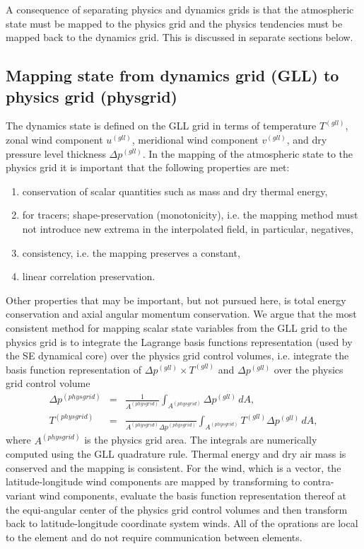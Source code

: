 
A consequence of separating physics and dynamics grids is that the atmospheric state must be mapped to the physics grid and the physics tendencies must be mapped back to the dynamics grid. This is discussed in separate sections below. 
\subsection{Mapping state from dynamics grid (GLL) to physics grid (physgrid)}
The dynamics state is defined on the GLL grid in terms of temperature $T^{(gll)}$, zonal wind component $u^{(gll)}$, meridional wind component $v^{(gll)}$, and dry pressure level thickness $\Delta p^{(gll)}$. In the mapping of the atmospheric state to the physics grid it is important that the following properties are met:
\begin{enumerate}
\item conservation of scalar quantities such as mass and dry thermal energy,\label{prop1}
\item for tracers; shape-preservation (monotonicity), i.e. the mapping method must not introduce new extrema in the interpolated field, in particular, negatives,\label{prop2}
\item consistency, i.e. the mapping preserves a constant,\label{prop3}
\item linear correlation preservation.
\end{enumerate}
Other properties that may be important, but not pursued here, is total energy conservation and axial angular momentum conservation. We argue that the most consistent method for mapping scalar state variables from the GLL grid to the physics grid is to integrate the Lagrange basis functions representation (used by the SE dynamical core) over the physics grid control volumes, i.e. integrate the basis function representation of $\Delta p^{(gll)}\times T^{(gll)}$ and $\Delta p^{(gll)}$ over the physics grid control volume \citep[see, e.g., ][]{LTOUNGK2017MWR,UT2015MWR}
\begin{eqnarray}
\Delta p^{(physgrid)}&=&\frac{1}{A^{(physgrid)}}\int_{A^{(physgrid)}}\Delta p^{(gll)}\, dA,\\
T^{(physgrid)}&=&\frac{}{A^{(physgrid)}\Delta p^{(physgrid)}}\int_{A^{(physgrid)}}T^{(gll)}\Delta p^{(gll)}\, dA,
\end{eqnarray}
where $A^{(physgrid)}$ is the physics grid area. The integrals are numerically computed using the GLL quadrature rule. Thermal energy and dry air mass is conserved and the mapping is consistent. For the wind, which is a vector, the latitude-longitude wind components are mapped by transforming to contra-variant wind components, evaluate the basis function representation thereof at the equi-angular center of the physics grid control volumes and then transform back to latitude-longitude coordinate system winds. All of the oprations are local to the element and do not require communication between elements.


